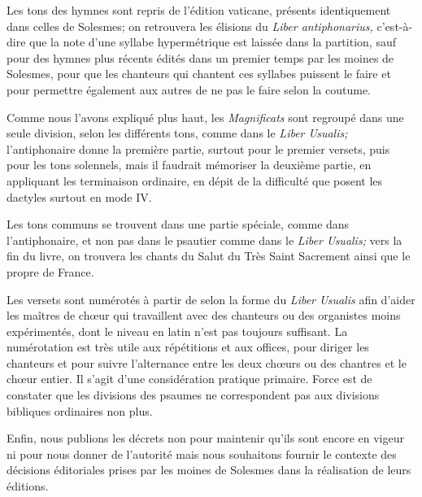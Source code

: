 \begin{frpars}
Les tons des hymnes sont repris de l'édition vaticane, présents identiquement dans celles de Solesmes; on retrouvera les élisions du \textit{Liber antiphonarius,} c’est-à-dire que la note d'une syllabe hypermétrique est laissée dans la partition, sauf pour des hymnes plus récents édités dans un premier temps par les moines de Solesmes, pour que les chanteurs qui chantent ces syllabes puissent le faire et pour permettre également aux autres de ne pas le faire selon la coutume. 

Comme nous l'avons expliqué plus haut, les \textit{Magnificats} sont regroupé dans une seule division, selon les différents tons, comme dans le \textit{Liber Usualis;} l'antiphonaire donne la première partie, surtout pour le premier versets, puis pour les tons solennels, mais il faudrait mémoriser la deuxième partie, en appliquant les terminaison ordinaire, en dépit de la difficulté que posent les dactyles surtout en mode IV.

Les tons communs se trouvent dans une partie spéciale, comme dans l'antiphonaire, et non pas dans le psautier comme dans  le \textit{Liber Usualis;} vers la fin du livre, on trouvera les chants du Salut du Très Saint Sacrement ainsi que le propre de France.

Les versets sont numérotés à partir de  selon la forme du \textit{Liber Usualis} afin d'aider les maîtres de chœur qui travaillent avec des chanteurs ou des organistes moins expérimentés, dont le niveau en latin n'est pas toujours suffisant. La numérotation est très utile aux répétitions et aux offices, pour diriger les chanteurs et pour suivre l'alternance entre les deux chœurs ou des chantres et le chœur entier. Il s'agit d'une considération pratique primaire. Force est de constater que les divisions des psaumes ne correspondent pas aux divisions bibliques ordinaires non plus.

Enfin, nous publions les décrets non pour maintenir qu'ils sont encore en vigeur ni pour nous donner de l'autorité mais nous souhaitons fournir le contexte des décisions éditoriales prises par les moines de Solesmes dans la réalisation de leurs éditions.
\end{frpars}
